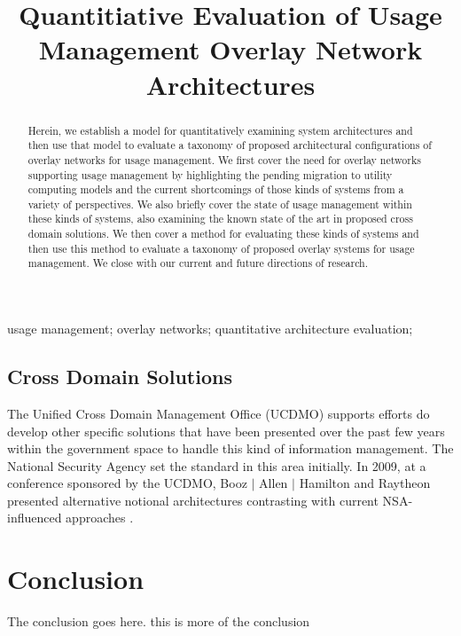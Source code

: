\documentclass[10pt, conference, compsocconf]{IEEEtran}
\begin{document}
\title{Quantitiative Evaluation of Usage Management Overlay Network Architectures}

\author{
\and
{}
}

\maketitle


\begin{abstract}
Herein, we establish a model for quantitatively examining system architectures and then use that model to evaluate a taxonomy of proposed architectural configurations of overlay networks for usage management.
We first cover the need for overlay networks supporting usage management by highlighting the pending migration to utility computing models and the current shortcomings of those kinds of systems from a variety of perspectives.  We also briefly cover the state of usage management within these kinds of systems, also examining the known state of the art in proposed cross domain solutions.  We then cover a method for evaluating these kinds of systems and then use this method to evaluate a taxonomy of proposed overlay systems for usage management.  We close with our current and future directions of research. 
\end{abstract}

\begin{IEEEkeywords}
usage management; overlay networks; quantitative architecture evaluation;

\end{IEEEkeywords}

\IEEEpeerreviewmaketitle




\subsection{Cross Domain Solutions}
The Unified Cross Domain Management Office (UCDMO) supports efforts do develop other specific solutions that have been presented over the past few years within the government space to handle this kind of information management.  The National Security Agency set the standard in this area initially.  In 2009, at a conference sponsored by the UCDMO, Booz $\mid$ Allen $\mid$ Hamilton and Raytheon presented alternative notional architectures contrasting with current NSA-influenced approaches \cite{proposal:nsa-arch,proposal:gig-arch,proposal:bah-arch,proposal:raytheon-arch}.



\section{Conclusion}
The conclusion goes here. this is more of the conclusion



\end{document}
